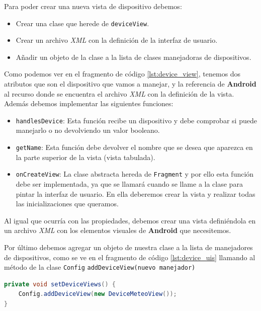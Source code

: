 \bigskip
Para poder crear una nueva vista de dispositivo debemos:

\begin{itemize}
  \item Crear una clase que herede de \texttt{deviceView}.
  \item Crear un archivo \textit{XML} con la definición de la interfaz de usuario.
  \item Añadir un objeto de la clase a la lista de clases manejadoras de dispositivos.
\end{itemize}


Como podemos ver en el fragmento de código \ref{lst:device_view}, tenemos dos atributos que son el dispositivo que vamos a manejar, y la referencia de \textbf{Android} al recurso donde se encuentra el archivo \textit{XML} con la definición de la vista. Además debemos implementar las siguientes funciones:


\begin{itemize}
  \item \texttt{handlesDevice}:
  Esta función recibe un dispositivo y debe comprobar si puede manejarlo o no devolviendo un valor booleano.

  \item \texttt{getName}:
  Esta función debe devolver el nombre que se desea que aparezca en la parte superior de la vista (vista tabulada).

  \item \texttt{onCreateView}:
  La clase abstracta hereda de \texttt{Fragment} y por ello esta función debe ser implementada, ya que se llamará cuando se llame a la clase para pintar la interfaz de usuario\cite{ALCA}. En ella deberemos crear la vista y realizar todas las inicializaciones que queramos.

\end{itemize}

\bigskip
Al igual que ocurría con las propiedades, debemos crear una vista definiéndola en un archivo \textit{XML} con los elementos visuales de \textbf{Android} que necesitemos.

\bigskip
Por último debemos agregar un objeto de nuestra clase a la lista de manejadores de dispositivos, como se ve en el fragmento de código \ref{lst:device_uis} llamando al método de la clase \texttt{Config} \texttt{addDeviceView(nuevo manejador)}

\begin{lstlisting}[language=Java,caption={Lista de objetos manejadores de dispositivos},label={lst:device_uis}]
private void setDeviceViews() {
    Config.addDeviceView(new DeviceMeteoView());
}

\end{lstlisting}

